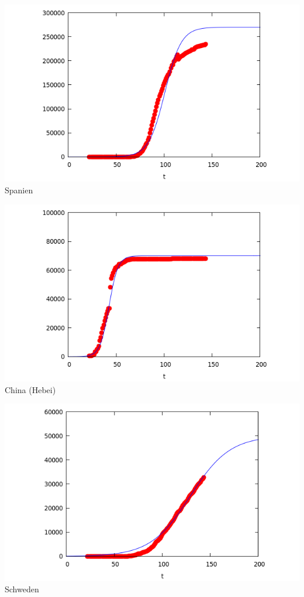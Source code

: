 \documentclass[a4paper,11pt]{article}
\begin{document}
\begin{center}
  \begin{minipage}{.3\textwidth}\centering
    \includegraphics[width=\textwidth]{Spain-2.png}\\[1em] {Spanien}
  \end{minipage}\hfill
  \begin{minipage}{.3\textwidth}\centering
    \includegraphics[width=\textwidth]{China-2.png}\\[1em] {China (Hebei)}
  \end{minipage}\hfill
  \begin{minipage}{.3\textwidth}\centering
    \includegraphics[width=\textwidth]{Sweden-2.png}\\[1em] {Schweden}
  \end{minipage}
\end{center}
\end{document}
